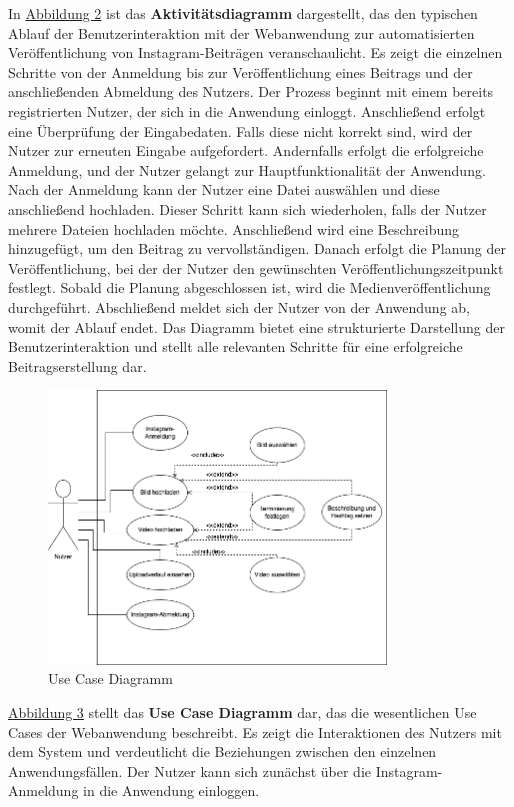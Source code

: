 \clearpage
In \hyperref[fig:fig-2]{Abbildung 2} ist das \textbf{Aktivitätsdiagramm} dargestellt, das den typischen Ablauf der Benutzerinteraktion mit der Webanwendung zur 
automatisierten Veröffentlichung von Instagram-Beiträgen veranschaulicht. Es zeigt die einzelnen Schritte von der Anmeldung bis zur Veröffentlichung eines Beitrags 
und der anschließenden Abmeldung des Nutzers. Der Prozess beginnt mit einem bereits registrierten Nutzer, der sich in die Anwendung einloggt. Anschließend erfolgt 
eine Überprüfung der Eingabedaten. Falls diese nicht korrekt sind, wird der Nutzer zur erneuten Eingabe aufgefordert. Andernfalls erfolgt die erfolgreiche Anmeldung, 
und der Nutzer gelangt zur Hauptfunktionalität der Anwendung. Nach der Anmeldung kann der Nutzer eine Datei auswählen und diese anschließend hochladen. Dieser Schritt 
kann sich wiederholen, falls der Nutzer mehrere Dateien hochladen möchte. Anschließend wird eine Beschreibung hinzugefügt, um den Beitrag zu vervollständigen. Danach 
erfolgt die Planung der Veröffentlichung, bei der der Nutzer den gewünschten Veröffentlichungszeitpunkt festlegt. Sobald die Planung abgeschlossen ist, wird die 
Medienveröffentlichung durchgeführt. Abschließend meldet sich der Nutzer von der Anwendung ab, womit der Ablauf endet. Das Diagramm bietet eine strukturierte 
Darstellung der Benutzerinteraktion und stellt alle relevanten Schritte für eine erfolgreiche Beitragserstellung dar.

\begin{figure}[htb]
    \centering
    \includegraphics[width=0.8\textwidth]{graphics/use_case_diagram.png}
    \caption{Use Case Diagramm}
    \label{fig:fig-3}
\end{figure}

\hyperref[fig:fig-3]{Abbildung 3} stellt das \textbf{Use Case Diagramm} dar, das die wesentlichen Use Cases der Webanwendung beschreibt. Es zeigt die Interaktionen 
des Nutzers mit dem System und verdeutlicht die Beziehungen zwischen den einzelnen Anwendungsfällen. Der Nutzer kann sich zunächst über die Instagram-Anmeldung in 
die Anwendung einloggen.

